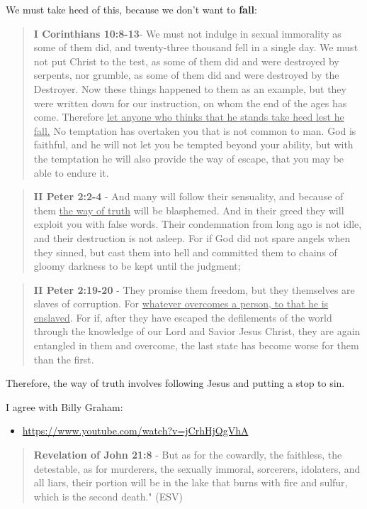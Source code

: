 \documentclass[11pt]{article}
\begin{document}
We must take heed of this, because we don't want to \textbf{fall}:

\begin{quote}
\textbf{I Corinthians 10:8-13}- We must not indulge in sexual immorality as some of them did, and twenty-three thousand fell in a single day. We must not put Christ to the test, as some of them did and were destroyed by serpents, nor grumble, as some of them did and were destroyed by the Destroyer. Now these things happened to them as an example, but they were written down for our instruction, on whom the end of the ages has come. Therefore \uline{let anyone who thinks that he stands take heed lest he fall.} No temptation has overtaken you that is not common to man. God is faithful, and he will not let you be tempted beyond your ability, but with the temptation he will also provide the way of escape, that you may be able to endure it.
\end{quote}

\begin{quote}
\textbf{II Peter 2:2-4} - And many will follow their sensuality, and because of them \uline{the way of truth} will be blasphemed. And in their greed they will exploit you with false words. Their condemnation from long ago is not idle, and their destruction is not asleep. For if God did not spare angels when they sinned, but cast them into hell and committed them to chains of gloomy darkness to be kept until the judgment;
\end{quote}

\begin{quote}
\textbf{II Peter 2:19-20} - They promise them freedom, but they themselves are slaves of corruption. For \uline{whatever overcomes a person, to that he is enslaved}. For if, after they have escaped the defilements of the world through the knowledge of our Lord and Savior Jesus Christ, they are again entangled in them and overcome, the last state has become worse for them than the first.
\end{quote}

Therefore, the way of truth involves following Jesus and putting a stop to sin.

I agree with Billy Graham:
\begin{itemize}
\item \url{https://www.youtube.com/watch?v=jCrhHjQgVhA}
\end{itemize}

\begin{quote}
\textbf{Revelation of John 21:8} - But as for the cowardly, the faithless, the detestable, as for murderers, the sexually immoral, sorcerers, idolaters, and all liars, their portion will be in the lake that burns with fire and sulfur, which is the second death." (ESV)
\end{quote}
\end{document}
